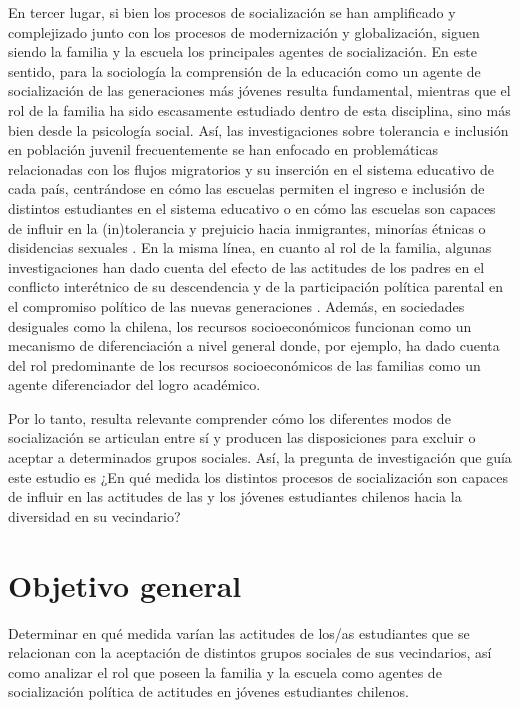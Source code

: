 \documentclass[12pt,twoside]{templates/facsothesis}
\begin{document}
En tercer lugar, si bien los procesos de socialización se han amplificado y complejizado junto con los procesos de modernización y globalización, siguen siendo la familia y la escuela los principales agentes de socialización. En este sentido, para la sociología la comprensión de la educación como un agente de socialización de las generaciones más jóvenes resulta fundamental, mientras que el rol de la familia ha sido escasamente estudiado dentro de esta disciplina, sino más bien desde la psicología social. Así, las investigaciones sobre tolerancia e inclusión en población juvenil frecuentemente se han enfocado en problemáticas relacionadas con los flujos migratorios y su inserción en el sistema educativo de cada país, centrándose en cómo las escuelas permiten el ingreso e inclusión de distintos estudiantes en el sistema educativo \citep{belleic_estudio_2013, ortiz_Actitudes_2016, stefoni_Educacion_2016a} o en cómo las escuelas son capaces de influir en la (in)tolerancia y prejuicio hacia inmigrantes, minorías étnicas o disidencias sexuales \citep{lee_Tolerated_2014, maurissen_Classroom_2020, trevino_Influence_2018}. En la misma línea, en cuanto al rol de la familia, algunas investigaciones han dado cuenta del efecto de las actitudes de los padres en el conflicto interétnico de su descendencia \citep{medjedovic_intergroup_2021} y de la participación política parental en el compromiso político de las nuevas generaciones \citep{bacovsky_raising_2021}. Además, en sociedades desiguales como la chilena, los recursos socioeconómicos funcionan como un mecanismo de diferenciación a nivel general donde, por ejemplo, \citet{belleic_estudio_2013} ha dado cuenta del rol predominante de los recursos socioeconómicos de las familias como un agente diferenciador del logro académico.

Por lo tanto, resulta relevante comprender cómo los diferentes modos de socialización se articulan entre sí y producen las disposiciones para excluir o aceptar a determinados grupos sociales. Así, la pregunta de investigación que guía este estudio es ¿En qué medida los distintos procesos de socialización son capaces de influir en las actitudes de las y los jóvenes estudiantes chilenos hacia la diversidad en su vecindario?

\hypertarget{objetivo-general}{%
\section{Objetivo general}\label{objetivo-general}}

Determinar en qué medida varían las actitudes de los/as estudiantes que se relacionan con la aceptación de distintos grupos sociales de sus vecindarios, así como analizar el rol que poseen la familia y la escuela como agentes de socialización política de actitudes en jóvenes estudiantes chilenos.
\end{document}

